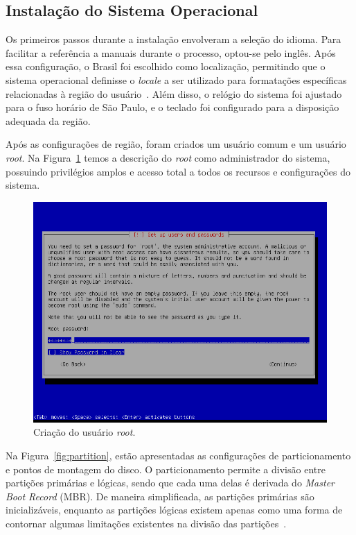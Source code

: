 \documentclass[
	12pt,				%
	oneside,   	        %
	a4paper,			%
	english,			%
	french,				%
	spanish,			%
	brazil,				%
	]{pacotes/abntex2}
\begin{document}
\subsection{Instalação do Sistema Operacional}
\label{subsec:instalacao}

Os primeiros passos durante a instalação envolveram a seleção do idioma. Para facilitar a referência a manuais durante o processo, optou-se pelo inglês. Após essa configuração, o Brasil foi escolhido como localização, permitindo que o sistema operacional definisse o \textit{locale} a ser utilizado para formatações específicas relacionadas à região do usuário~\cite{kerris2010}. Além disso, o relógio do sistema foi ajustado para o fuso horário de São Paulo, e o teclado foi configurado para a disposição adequada da região.

Após as configurações de região, foram criados um usuário comum e um usuário \textit{root}. Na Figura~\ref{fig:root} temos a descrição do \textit{root} como administrador do sistema, possuindo privilégios amplos e acesso total a todos os recursos e configurações do sistema.

\begin{figure}[H]
  \centering
  \includegraphics[scale=0.7]{figuras/root.png}
  \caption{Criação do usuário \textit{root}.}
  \label{fig:root}
\end{figure}

Na Figura~\ref{fig:partition}, estão apresentadas as configurações de particionamento e pontos de montagem do disco. O particionamento permite a divisão entre partições primárias e lógicas, sendo que cada uma delas é derivada do \textit{Master Boot Record} (MBR). De maneira simplificada, as partições primárias são inicializáveis, enquanto as partições lógicas existem apenas como uma forma de contornar algumas limitações existentes na divisão das partições~\cite{archPartition}.
\end{document}

